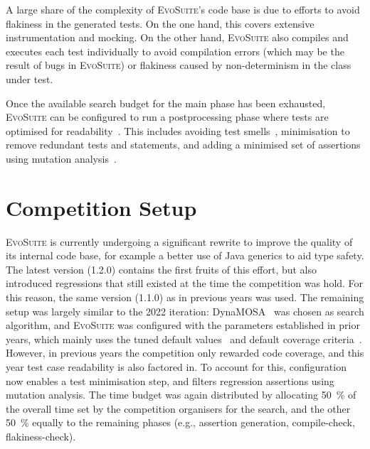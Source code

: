 \documentclass[10pt,conference]{IEEEtran}
\newcommand{\EVOSUITE}{\textsc{EvoSuite}\xspace}
\begin{document}
A large share of the complexity of \EVOSUITE's code base is due to efforts to
avoid flakiness in the generated tests. On the one hand, this covers extensive
instrumentation and mocking. On the other hand, \EVOSUITE also compiles and
executes each test individually to avoid compilation errors (which may be the
result of bugs in \EVOSUITE) or flakiness caused by non-determinism in the
class under test.

Once the available search budget for the main phase has been exhausted,
\EVOSUITE can be configured to run a postprocessing phase where tests are optimised for
readability~\cite{FrA11c,FrA13a}. This includes avoiding test
smells~\cite{panichella2020revisiting}, minimisation to remove redundant tests
and statements, and adding a minimised set of assertions using mutation
analysis~\cite{10.1109/TSE.2011.93}.


\section{Competition Setup}\label{sec:setup}

\EVOSUITE is currently undergoing a significant rewrite to improve the quality
of its internal code base, for example a better use of Java generics to aid
type safety. The latest version (1.2.0) contains the first fruits of this effort,
but also introduced regressions that still existed at the time the competition was
hold. For this reason, the same version (1.1.0) as in previous years was used.
The remaining setup was largely similar to the 2022 iteration: DynaMOSA~\cite{dynamosa}
was chosen as search algorithm, and \EVOSUITE was configured with the parameters
established in prior years, which mainly uses the tuned default
values~\cite{arcuri2013parameter} and default coverage criteria~\cite{rojas2015combining}.
%
%
However, in previous years the competition only rewarded code coverage, and this year
test case readability is also factored in. To account for this, configuration now
enables a test minimisation step, and filters regression assertions using mutation analysis.
%
The time budget was again distributed by allocating \SI{50}{\percent} of the overall time
set by the competition organisers for the search, and the other \SI{50}{\percent} equally to
the remaining phases (e.g., assertion generation, compile-check, flakiness-check).
\end{document}

